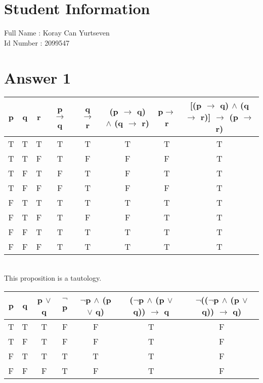 \documentclass[12pt]{article}
\begin{document}
\section*{Student Information } 
Full Name : Koray Can Yurtseven \\
Id Number : 2099547 \\

\section*{Answer 1}

\begin{tabular} {| c | c | c| c | c | c | c | c |}
  \hline
  
  p& q & r & p $\rightarrow$ q& q $\rightarrow$ r& (p $\rightarrow$ q) $\land$ (q $\rightarrow$ r)& p$\rightarrow$ r & [(p $\rightarrow$ q) $\land$ (q $\rightarrow$ r)] $\rightarrow$ (p $\rightarrow$ r) 	\\ \hline
\hline
				   T & T & T & T & T & T & T &T\\ \hline
				   T & T & F & T & F & F & F & T\\ \hline
				   T & F & T & F & T & F & T & T\\ \hline
				   T & F & F & F & T & F & F & T\\ \hline
				   F & T & T & T & T & T & T & T\\ \hline
				   F & T & F & T & F & F & T & T\\ \hline
				   F & F & T & T & T & T & T & T\\ \hline
				   F & F & F & T & T & T & T & T\\ \hline
                   

\end{tabular}\\


This proposition is a tautology.\\




\begin{tabular} {| c | c | c | c | c | c | c |}
 \hline
 
 p & q & p $\lor$ q & $\neg$p& $\neg$p $\land$ (p $\lor$ q)& ($\neg$p $\land$ (p $\lor$ q)) $\rightarrow$ q	& 	$\neg$(($\neg$p $\land$ (p $\lor$ q)) $\rightarrow$ q)	\\ \hline
 \hline
				   T & T & T & F & F & T & F\\ \hline
				   T & F & T & F & F & T & F\\ \hline
				   F & T & T & T & T & T & F\\ \hline
				   F & F & F & T & F & T & F\\ \hline	
                   
  \end{tabular}\\
\end{document}
